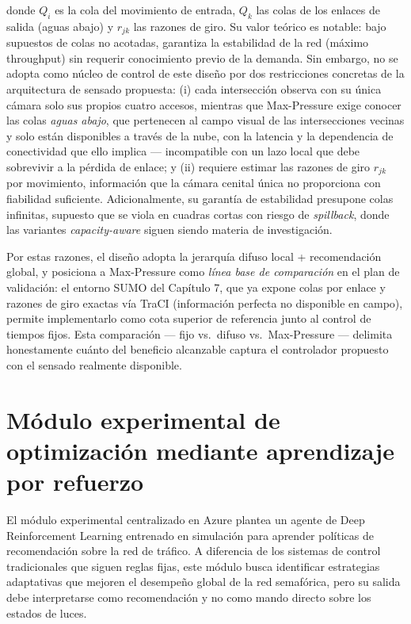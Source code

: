 \documentclass[12pt,a4paper,oneside]{report}
\begin{document}
donde \(Q_{i}\) es la cola del movimiento de entrada, \(Q_{k}\) las colas de los enlaces de salida (aguas abajo) y \(r_{jk}\) las razones de giro. Su valor teórico es notable: bajo supuestos de colas no acotadas, garantiza la estabilidad de la red (máximo throughput) sin requerir conocimiento previo de la demanda. Sin embargo, no se adopta como núcleo de control de este diseño por dos restricciones concretas de la arquitectura de sensado propuesta: (i) cada intersección observa con su única cámara solo sus propios cuatro accesos, mientras que Max-Pressure exige conocer las colas \emph{aguas abajo}, que pertenecen al campo visual de las intersecciones vecinas y solo están disponibles a través de la nube, con la latencia y la dependencia de conectividad que ello implica --- incompatible con un lazo local que debe sobrevivir a la pérdida de enlace; y (ii) requiere estimar las razones de giro \(r_{jk}\) por movimiento, información que la cámara cenital única no proporciona con fiabilidad suficiente. Adicionalmente, su garantía de estabilidad presupone colas infinitas, supuesto que se viola en cuadras cortas con riesgo de \emph{spillback}, donde las variantes \emph{capacity-aware} siguen siendo materia de investigación.

Por estas razones, el diseño adopta la jerarquía difuso local + recomendación global, y posiciona a Max-Pressure como \emph{línea base de comparación} en el plan de validación: el entorno SUMO del Capítulo 7, que ya expone colas por enlace y razones de giro exactas vía TraCI (información perfecta no disponible en campo), permite implementarlo como cota superior de referencia junto al control de tiempos fijos. Esta comparación --- fijo vs.\ difuso vs.\ Max-Pressure --- delimita honestamente cuánto del beneficio alcanzable captura el controlador propuesto con el sensado realmente disponible.

\section{Módulo experimental de optimización mediante aprendizaje por refuerzo}\label{motor-de-decisiuxf3n-mediante-aprendizaje-por-refuerzo}

El módulo experimental centralizado en Azure plantea un agente de Deep Reinforcement Learning entrenado en simulación para aprender políticas de recomendación sobre la red de tráfico. A diferencia de los sistemas de control tradicionales que siguen reglas fijas, este módulo busca identificar estrategias adaptativas que mejoren el desempeño global de la red semafórica, pero su salida debe interpretarse como recomendación y no como mando directo sobre los estados de luces.
\end{document}
